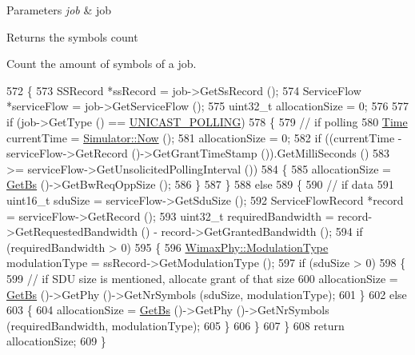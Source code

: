 \begin{DoxyParams}{Parameters}
{\em job} & job \\
\hline
\end{DoxyParams}
\begin{DoxyReturn}{Returns}
the symbols count
\end{DoxyReturn}
Count the amount of symbols of a job. 
\begin{DoxyCode}
572 \{
573   SSRecord *ssRecord = job->GetSsRecord ();
574   ServiceFlow *serviceFlow = job->GetServiceFlow ();
575   uint32\_t allocationSize = 0;
576 
577   \textcolor{keywordflow}{if} (job->GetType () == \hyperlink{namespacens3_a534f9a14e4d9aeb5b400e61f152a73a2ab774c9fb3410eec7ee3c8367c50ccbb3}{UNICAST\_POLLING})
578     \{
579       \textcolor{comment}{// if polling}
580       \hyperlink{namespacens3_1_1TracedValueCallback_a7ffd3e7c142ffe7c8a1d2db9b8de38ec}{Time} currentTime = \hyperlink{classns3_1_1Simulator_ac3178fa975b419f7875e7105be122800}{Simulator::Now} ();
581       allocationSize = 0;
582       \textcolor{keywordflow}{if} ((currentTime - serviceFlow->GetRecord ()->GetGrantTimeStamp ()).GetMilliSeconds ()
583           >= serviceFlow->GetUnsolicitedPollingInterval ())
584         \{
585           allocationSize = \hyperlink{classns3_1_1UplinkScheduler_afe61b7de71d92d2dff1b135744a6ff7e}{GetBs} ()->GetBwReqOppSize ();
586         \}
587     \}
588   \textcolor{keywordflow}{else}
589     \{
590       \textcolor{comment}{// if data}
591       uint16\_t sduSize = serviceFlow->GetSduSize ();
592       ServiceFlowRecord *record = serviceFlow->GetRecord ();
593       uint32\_t requiredBandwidth = record->GetRequestedBandwidth () - record->GetGrantedBandwidth ();
594       \textcolor{keywordflow}{if} (requiredBandwidth > 0)
595         \{
596           \hyperlink{classns3_1_1WimaxPhy_a044c5d8a48ca992c39c2a946f6e755fa}{WimaxPhy::ModulationType} modulationType = ssRecord->GetModulationType ();
597           \textcolor{keywordflow}{if} (sduSize > 0)
598             \{
599               \textcolor{comment}{// if SDU size is mentioned, allocate grant of that size}
600               allocationSize = \hyperlink{classns3_1_1UplinkScheduler_afe61b7de71d92d2dff1b135744a6ff7e}{GetBs} ()->GetPhy ()->GetNrSymbols (sduSize, modulationType);
601             \}
602           \textcolor{keywordflow}{else}
603             \{
604               allocationSize = \hyperlink{classns3_1_1UplinkScheduler_afe61b7de71d92d2dff1b135744a6ff7e}{GetBs} ()->GetPhy ()->GetNrSymbols (requiredBandwidth, modulationType);
605             \}
606         \}
607     \}
608   \textcolor{keywordflow}{return} allocationSize;
609 \}
\end{DoxyCode}


